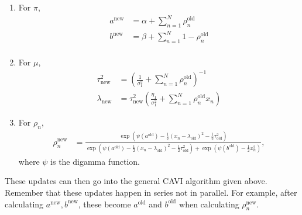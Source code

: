 \begin{enumerate}
    \item For $\pi$,
    \begin{align*}
        a^\text{new} &=\alpha + \sum_{n=1}^N \rho_n^{\text{old}}\\
        b^\text{new} &=\beta + \sum_{n=1}^N 1-\rho_n^{\text{old}}\\
    \end{align*}
    \item For $\mu$,
    \begin{align*}
        \tau^2_{\text{new}} &=\left(\frac{1}{\sigma_1^2}+\sum_{n=1}^N \rho_n^{\text{old}}\right)^{-1}\\
    \lambda_{\text{new}} &= \tau^2_{\text{new}}\left(\frac{\eta_1}{\sigma_1^2}+\sum_{n=1}^N \rho_n^{\text{old}}x_n\right)
    \end{align*}
    \item For $\rho_n$,
    \begin{align*}
        \rho_n^{\text{new}} &=\frac{\exp\left(\psi(a^{\text{old}})-\frac{1}{2}(x_n-\lambda_{\text{old}})^2-\frac{1}{2}\tau^2_{\text{old}}\right)}{\exp\left(\psi(a^{\text{old}})-\frac{1}{2}(x_n-\lambda_{\text{old}})^2-\frac{1}{2}\tau^2_{\text{old}}\right) + \exp\left(\psi(b^\text{old})-\frac{1}{2}x_n^2\right)},
    \end{align*}
    where $\psi$ is the digamma function.
\end{enumerate}
These updates can then go into the general CAVI algorithm given above. Remember that these updates happen in series not in parallel. For example, after calculating $a^{\text{new}},b^{\text{new}}$, these become $a^{\text{old}}$ and $b^{\text{old}}$ when calculating $\rho_n^{\text{new}}$. 

